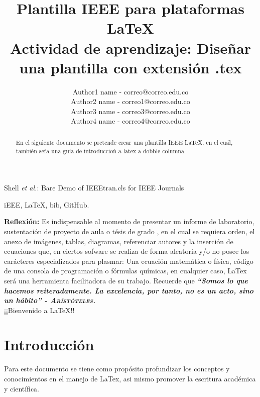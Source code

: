 \documentclass[journal, spanish]{IEEEtran}
\begin{document}
\title{Plantilla IEEE para plataformas \LaTeX \\
\small{Actividad de aprendizaje: Diseñar una plantilla con extensión .tex}}

\author{Author1 name - correo@correo.edu.co \\Author2 name - correo1@correo.edu.co \\Author3 name - correo3@correo.edu.co \\Author4 name - correo4@correo.edu.co}
        
{Shell \MakeLowercase{\textit{et al.}}: Bare Demo of IEEEtran.cls for IEEE Journals}

\maketitle

\begin{abstract} 
En el siguiente documento se pretende crear una plantilla IEEE LaTeX, en el cuál, también seŕa una guía de introduccioń a latex a dobble columna.
\end{abstract} 

\begin{IEEEkeywords}
iEEE, LaTeX, bib, GitHub.\\
\end{IEEEkeywords}

\textbf{Reflexión:} Es indispensable al momento de presentar un informe de laboratorio, sustentación de proyecto de aula o tésis de grado , en el cual se requiera  orden, el anexo de imágenes, tablas, diagramas, referenciar autores y la inserción de ecuaciones que, en ciertos sofware se realiza de forma aleatoria y/o no posee los carácteres especializados para plasmar: Una ecuación matemática o física, código de una consola de programación o fórmulas químicas, en cualquier caso, LaTex será una herramienta facilitadora de su trabajo. Recuerde que  \textit{\textbf{“Somos lo que hacemos reiteradamente. La excelencia, por tanto, no es un acto, sino un hábito” \textsc{- Arístóteles.}}} \\¡¡Bienvenido a \LaTeX!!


\section{Introducción}
Para este documento se tiene como propósito profundizar los conceptos y conocimientos en el manejo de LaTex, asi mismo promover la escritura académica y científica.
\end{document}
